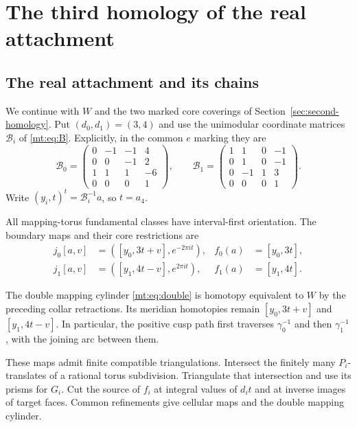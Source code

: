 \section{The third homology of the real attachment}\label{sec:third-homology}

\subsection{The real attachment and its chains}

We continue with $W$ and the two marked core coverings of
Section~\ref{sec:second-homology}. Put $(d_0,d_1)=(3,4)$ and use the
unimodular coordinate matrices $\mathcal B_i$ of \eqref{mt:eq:B}.
Explicitly, in the common $e$ marking they are
\begin{equation}\label{th:eq:B}
\mathcal B_0=\begin{pmatrix}0&-1&-1&4\\0&0&-1&2\\1&1&1&-6\\0&0&0&1\end{pmatrix},
\qquad
\mathcal B_1=\begin{pmatrix}1&1&0&-1\\0&1&0&-1\\0&-1&1&3\\0&0&0&1\end{pmatrix}.
\end{equation}
Write $(y_i,t)^t=\mathcal B_i^{-1}a$, so $t=a_4$.

All mapping-torus fundamental classes have interval-first orientation.
The boundary maps and their core restrictions are
\begin{equation}\label{th:eq:maps}
\begin{aligned}
j_0[a,v]&=([y_0,3t+v],e^{-2\pi it}),&
f_0(a)&=[y_0,3t],\\
j_1[a,v]&=([y_1,4t-v],e^{2\pi it}),&
f_1(a)&=[y_1,4t].
\end{aligned}
\end{equation}

The double mapping cylinder \eqref{mt:eq:double} is homotopy
equivalent to $W$ by the preceding collar retractions. Its meridian
homotopies remain $[y_0,3t+v]$ and $[y_1,4t-v]$. In particular,
the positive cusp path first traverses $\gamma_0^{-1}$ and then
$\gamma_1^{-1}$, with the joining arc between them.

These maps admit finite compatible triangulations.
Intersect the finitely many $P_i$-translates of a rational torus subdivision.
Triangulate that intersection and use its prisms for $G_i$.
Cut the source of $f_i$ at integral values of $d_it$ and at inverse images of target faces.
Common refinements give cellular maps and the double mapping cylinder.

